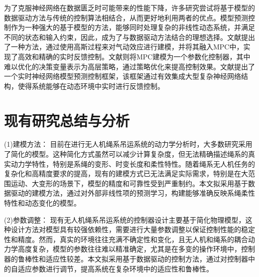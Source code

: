 \documentclass[lang=chs, degree=master, blindreview=false, winfonts=true]{yanputhesis}
\begin{document}
为了克服神经网络在数据匮乏时可能带来的性能下降，许多研究尝试将基于模型的数据驱动方法与传统的控制算法相结合，从而更好地利用两者的优点。模型预测控制作为一种强大的基于模型的方法，能够同时处理复杂的非线性动态系统，并满足不同的状态和输入约束\cite{neunert2016fast}，因此，成为了与数据驱动方法结合的理想选择。文献提出了一种方法，通过使用高斯过程来对气动效应进行建模，并将其融入MPC中，实现了高效和精确的实时反馈控制。文献则将MPC建模为一个参数化控制器，其中难以优化的决策变量表示为高层策略，通过策略优化来提高控制效果。文献提出了一个实时神经网络模型预测控制框架，该框架通过有效集成大型复杂神经网络结构，使得系统能够在动态环境中实时进行反馈控制。


\section{现有研究总结与分析}
(1)建模方法：
目前在进行无人机绳系吊运系统的动力学分析时，大多数研究采用了简化的模型。这种简化方式虽然可以减少计算复杂度，但无法精确描述绳系的真实动力学特性，特别是系绳的变形、时变长度和柔性特性。随着绳系无人机任务的复杂化和高精度要求的提高，现有的建模方式已无法满足实际需求，特别是在大范围运动、大变形的场景下，模型的精度和可靠性受到严重制约。本文拟采用基于数据驱动的建模方法，通过对外部非线性项的预测学习，构建能够准确反映系绳柔性特性和动态变化的模型。

(2)参数调整：
现有无人机绳系吊运系统的控制器设计主要基于简化物理模型，这种设计方法对模型具有较强依赖性，需要进行大量参数调整以保证控制性能的稳定性和精度。然而，真实的环境往往充满不确定性和变化，且无人机和绳系的耦合动力学高度复杂，模型的参数往往难以精准确定，尤其是在多变的操作环境中，控制器的鲁棒性和适应性较差。本文拟采用基于数据驱动的控制方法，通过对控制器中的自适应参数进行调节，提高系统在复杂环境中的适应性和鲁棒性。
\end{document}
